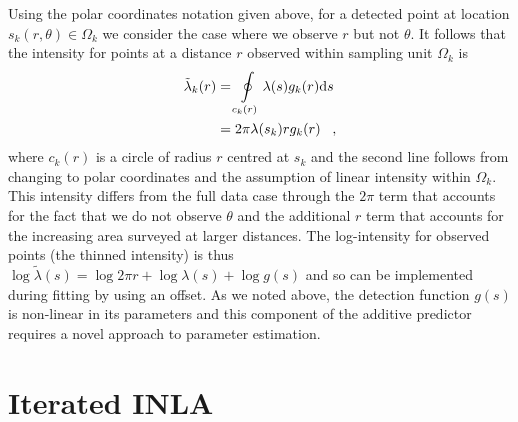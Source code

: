 \documentclass{stylefile16/statsoc}
\newcommand{\tl}{\tilde{\lambda}}   %
\begin{document}
Using the polar coordinates notation given above, for a detected point at location $s_k(r, \theta) \in \Omega_k$ we consider the case where we observe $r$ but not $\theta$.  It follows that the intensity for points at a distance $r$ observed within sampling unit $\Omega_k$ is
\begin{align}
\label{intensity-incomplete}
\tl_k(r) &= \oint\displaylimits_{c_k(r)} \lambda(s)g_k(r)\mathrm{d}s \nonumber \\
&= 2\pi\lambda(s_k)rg_k(r) \;\;\; ,
\end{align}
 where $c_k(r)$ is a circle of radius $r$ centred at $s_k$ and the second line follows from changing to polar coordinates and the assumption of linear intensity within $\Omega_k$.  This intensity differs from the full data case through the $2\pi$  term that accounts for the fact that we do not observe $\theta$ and the additional $r$ term that accounts for the increasing area surveyed at larger distances.  The log-intensity for observed points (the thinned intensity) is thus $\log\tl(s) = \log 2 \pi r + \log\lambda(s) + \log g(s)$ and so can be implemented during fitting by using an offset.  As we noted above, the detection function $g(s)$ is non-linear in its parameters and this component of the additive predictor requires a novel approach to parameter estimation.

\section{Iterated INLA}
\label{sec-iinla}
\end{document}
